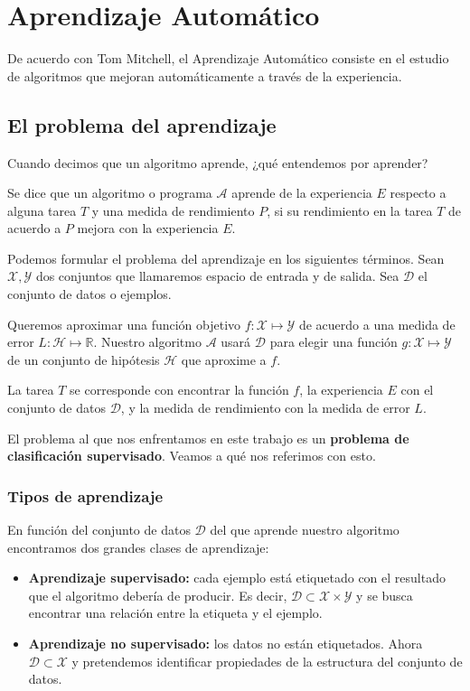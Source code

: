 \chapter{\label{ch3}Aprendizaje Automático}

De acuerdo con Tom Mitchell, el Aprendizaje Automático consiste en el estudio de algoritmos que mejoran automáticamente a través de la experiencia. 

\section{El problema del aprendizaje}

Cuando decimos que un algoritmo aprende, ¿qué entendemos por aprender? 

\begin{definition*}
	Se dice que un algoritmo o programa $\mathcal{A}$ aprende de la experiencia $E$ respecto a alguna tarea $T$ y una medida de rendimiento $P$, si su rendimiento en la tarea $T$ de acuerdo a $P$ mejora con la experiencia $E$.
\end{definition*}

Podemos formular el problema del aprendizaje en los siguientes términos. Sean $\mathcal{X, Y}$ dos conjuntos que llamaremos espacio de entrada y de salida. Sea $\mathcal{D}$ el conjunto de datos o ejemplos.

Queremos aproximar una función objetivo $f: \mathcal{X} \mapsto \mathcal{Y}$ de acuerdo a una medida de error $L: \mathcal{H} \mapsto \mathbb{R}$. Nuestro algoritmo $\mathcal{A}$ usará $\mathcal{D}$ para elegir una función $g: \mathcal{X} \mapsto \mathcal{Y}$ de un conjunto de hipótesis $\mathcal{H}$ que aproxime a $f$.

La tarea $T$ se corresponde con encontrar la función $f$, la experiencia $E$ con el conjunto de datos $\mathcal{D}$, y la medida de rendimiento con la medida de error $L$.

El problema al que nos enfrentamos en este trabajo es un \textbf{problema de clasificación supervisado}. Veamos a qué nos referimos con esto. 

\subsection{Tipos de aprendizaje}
En función del conjunto de datos $\mathcal{D}$ del que aprende nuestro algoritmo encontramos dos grandes clases de aprendizaje:
\begin{itemize}
	\item \textbf{Aprendizaje supervisado:} cada ejemplo está etiquetado con el resultado que el algoritmo debería de producir. Es decir, $\mathcal{D}\subset\mathcal{X}\times\mathcal{Y}$ y se busca encontrar una relación entre la etiqueta y el ejemplo.
	\item \textbf{Aprendizaje no supervisado:} los datos no están etiquetados. Ahora $\mathcal{D}\subset\mathcal{X}$ y pretendemos identificar propiedades de la estructura del conjunto de datos. 
\end{itemize}

